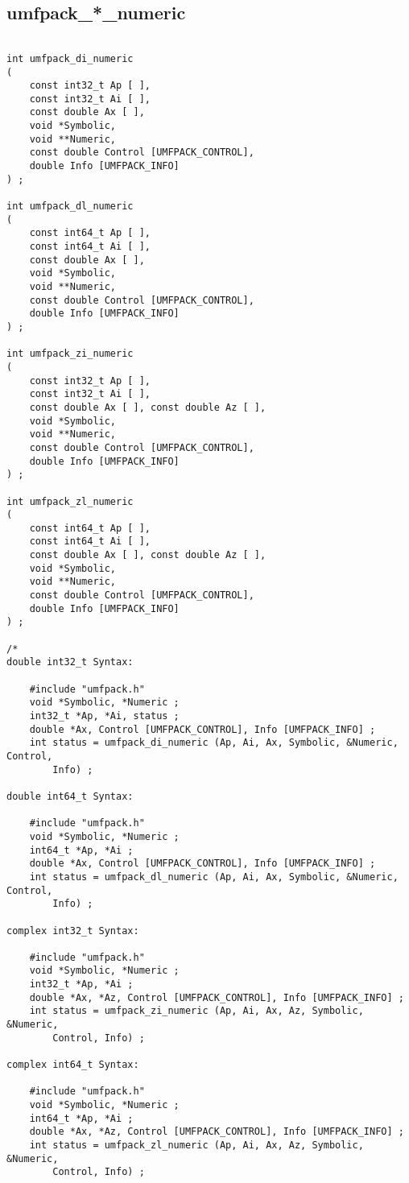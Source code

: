 \documentclass[11pt]{article}
\begin{document}
\newpage
\subsection{umfpack\_*\_numeric}

{\footnotesize
\begin{verbatim}

int umfpack_di_numeric
(
    const int32_t Ap [ ],
    const int32_t Ai [ ],
    const double Ax [ ],
    void *Symbolic,
    void **Numeric,
    const double Control [UMFPACK_CONTROL],
    double Info [UMFPACK_INFO]
) ;

int umfpack_dl_numeric
(
    const int64_t Ap [ ],
    const int64_t Ai [ ],
    const double Ax [ ],
    void *Symbolic,
    void **Numeric,
    const double Control [UMFPACK_CONTROL],
    double Info [UMFPACK_INFO]
) ;

int umfpack_zi_numeric
(
    const int32_t Ap [ ],
    const int32_t Ai [ ],
    const double Ax [ ], const double Az [ ],
    void *Symbolic,
    void **Numeric,
    const double Control [UMFPACK_CONTROL],
    double Info [UMFPACK_INFO]
) ;

int umfpack_zl_numeric
(
    const int64_t Ap [ ],
    const int64_t Ai [ ],
    const double Ax [ ], const double Az [ ],
    void *Symbolic,
    void **Numeric,
    const double Control [UMFPACK_CONTROL],
    double Info [UMFPACK_INFO]
) ;

/*
double int32_t Syntax:

    #include "umfpack.h"
    void *Symbolic, *Numeric ;
    int32_t *Ap, *Ai, status ;
    double *Ax, Control [UMFPACK_CONTROL], Info [UMFPACK_INFO] ;
    int status = umfpack_di_numeric (Ap, Ai, Ax, Symbolic, &Numeric, Control,
        Info) ;

double int64_t Syntax:

    #include "umfpack.h"
    void *Symbolic, *Numeric ;
    int64_t *Ap, *Ai ;
    double *Ax, Control [UMFPACK_CONTROL], Info [UMFPACK_INFO] ;
    int status = umfpack_dl_numeric (Ap, Ai, Ax, Symbolic, &Numeric, Control,
        Info) ;

complex int32_t Syntax:

    #include "umfpack.h"
    void *Symbolic, *Numeric ;
    int32_t *Ap, *Ai ;
    double *Ax, *Az, Control [UMFPACK_CONTROL], Info [UMFPACK_INFO] ;
    int status = umfpack_zi_numeric (Ap, Ai, Ax, Az, Symbolic, &Numeric,
        Control, Info) ;

complex int64_t Syntax:

    #include "umfpack.h"
    void *Symbolic, *Numeric ;
    int64_t *Ap, *Ai ;
    double *Ax, *Az, Control [UMFPACK_CONTROL], Info [UMFPACK_INFO] ;
    int status = umfpack_zl_numeric (Ap, Ai, Ax, Az, Symbolic, &Numeric,
        Control, Info) ;


\end{verbatim}}
\end{document}
